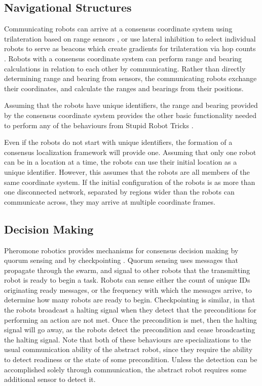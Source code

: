 \documentclass[]{article}
\begin{document}
\subsection{Navigational Structures} \label{pheremone_nav_struct}

Communicating robots can arrive at a consensus coordinate system using trilateration based on range sensors \cite{cheng2005robust}, or use lateral inhibition to select individual robots to serve as beacons which create gradients for trilateration via hop counts \cite{nagpal1999organizing}.
Robots with a consensus coordinate system can perform range and bearing calculations in relation to each other by communicating.
Rather than directly determining range and bearing from sensors, the communicating robots exchange their coordinates, and calculate the ranges and bearings from their positions. 

Assuming that the robots have unique identifiers, the range and bearing provided by the consensus coordinate system provides the other basic functionality needed to perform any of the behaviours from Stupid Robot Tricks \cite{mclurkin2004stupid}.

Even if the robots do not start with unique identifiers, the formation of a consensus localization framework will provide one.
Assuming that only one robot can be in a location at a time, the robots can use their initial location as a unique identifier. 
However, this assumes that the robots are all members of the same coordinate system.
If the initial configuration of the robots is as more than one disconnected network, separated by regions wider than the robots can communicate across, they may arrive at multiple coordinate frames.

\subsection{Decision Making}

Pheromone robotics provides mechanisms for consensus decision making by quorum sensing and by checkpointing \cite{nagpal2004catalog}. 
Quorum sensing uses messages that propagate through the swarm, and signal to other robots that the transmitting robot is ready to begin a task. 
Robots can sense either the count of unique IDs originating ready messages, or the frequency with which the messages arrive, to determine how many robots are ready to begin. 
Checkpointing is similar, in that the robots broadcast a halting signal when they detect that the preconditions for performing an action are not met.
Once the precondition is met, then the halting signal will go away, as the robots detect the precondition and cease broadcasting the halting signal. 
Note that both of these behaviours are specializations to the usual communication ability of the abstract robot, since they require the ability to detect readiness or the state of some precondition. 
Unless the detection can be accomplished solely through communication, the abstract robot requires some additional sensor to detect it. 
\end{document}
